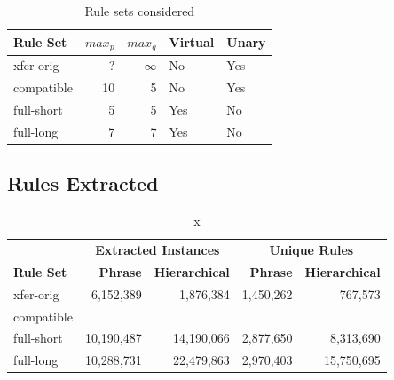 \documentclass[11pt]{article}
\begin{document}
\begin{table}[tbh!]
  \begin{tabular}{lrrll}
  {\bf Rule Set} & {\bf $max_p$} & {\bf $max_g$} & {\bf Virtual} & {\bf Unary} \\
  \hline \hline
  xfer-orig  &  ? & $\infty$ & No & Yes \\
  compatible & 10 & 5 & No & Yes \\
  \hline
  full-short &  5 & 5 & Yes & No \\
  full-long  &  7 & 7 & Yes & No \\
  \end{tabular}
  \caption{\label{Table-RuleSets} Rule sets considered}
\end{table}

\subsection{Rules Extracted}

\begin{table}[tbh!]
\begin{center}
\begin{tabular}{l|rr|rr}
 & \multicolumn{2}{c|}{{\bf Extracted Instances}} & \multicolumn{2}{c}{{\bf Unique Rules}} \\
{\bf Rule Set} & {\bf Phrase} & {\bf Hierarchical} & {\bf Phrase} & {\bf Hierarchical} \\
\hline \hline
xfer-orig  &  6,152,389 &  1,876,384  &  1,450,262 &    767,573 \\
compatible & &  &  & \\
\hline
full-short & 10,190,487 & 14,190,066  &  2,877,650 &  8,313,690 \\
full-long  & 10,288,731 & 22,479,863  &  2,970,403 & 15,750,695 \\
\end{tabular}
\end{center}
\caption{\label{Table-NumRules} x}
\end{table}
\end{document}
